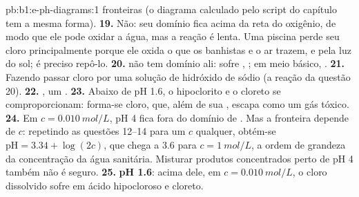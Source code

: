\begin{solution}{pb:b1:e-ph-diagrams:1}
fronteiras (o diagrama calculado pelo script do capítulo tem a mesma
forma).
\textbf{19.} Não: seu domínio fica acima da reta do oxigênio, de modo que
ele pode oxidar a água, mas a reação é lenta. Uma piscina perde seu cloro
principalmente porque ele oxida o que os banhistas e o ar trazem, e pela
luz do sol; é preciso repô-lo.
\textbf{20.}  não tem domínio ali: sofre ,
; em meio básico,
.
\textbf{21.} Fazendo passar cloro por uma solução de hidróxido de sódio
(a reação da questão 20).
\textbf{22.} , um .
\textbf{23.} Abaixo de pH 1.6, o hipoclorito e o cloreto se
comproporcionam: forma-se cloro, que, além de sua , escapa
como um gás tóxico.
\textbf{24.} Em $c = \qty{0.010}{mol/L}$, pH 4 fica fora do domínio de
. Mas a fronteira depende de $c$: repetindo as questões 12--14
para um $c$ qualquer, obtém-se $\mathrm{pH} = 3.34 + \log(2c)$, que chega
a 3.6 para $c = \qty{1}{mol/L}$, a ordem de grandeza da concentração da
água sanitária. Misturar produtos concentrados perto de pH 4 também não é
seguro.
\textbf{25.} \textbf{pH 1.6}: acima dele, em $c = \qty{0.010}{mol/L}$, o
cloro dissolvido sofre  em ácido hipocloroso e
cloreto.
\end{solution}
